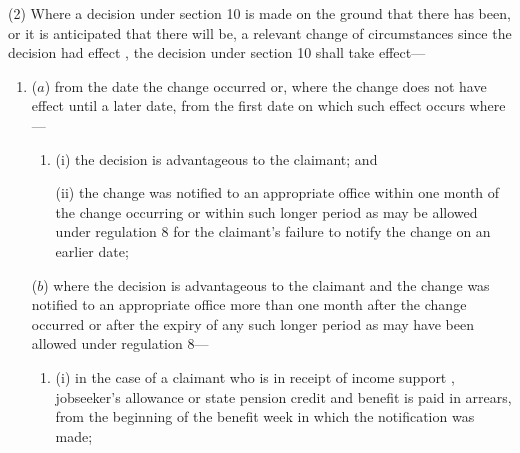 \documentclass[12pt,a4paper]{article}
\begin{document}
(2) Where a decision under section 10 is made on the ground that there has been, or it is anticipated that there will be, a relevant change of circumstances since the decision 
had effect%
, the decision under section 10 shall take effect—
\begin{enumerate}\item[]
%

($a$) from the date the change occurred or, where the change does not have effect until a later date, from the first date on which such effect occurs where---
\begin{enumerate}\item[]
(i) the decision is advantageous to the claimant; and

(ii) the change was notified to an appropriate office within one month of the change occurring or within such longer period as may be allowed under regulation 8 for the claimant’s failure to notify the change on an earlier date;
\end{enumerate}

($b$) where the decision is advantageous to the claimant and the change was notified to an appropriate office more than one month after the change occurred or after the expiry of any such longer period as may have been allowed under regulation 8—
\begin{enumerate}\item[]
(i) in the case of a claimant who is in receipt of income support%
, jobseeker's allowance or state pension credit  %
and benefit is paid in arrears, from the beginning of the benefit week in which the notification was made;


\end{enumerate}
\end{enumerate}
\end{document}
